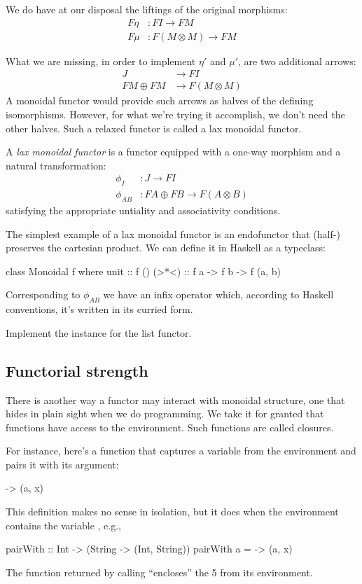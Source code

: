 \documentclass[DaoFP]{subfiles}
\begin{document}
We do have at our disposal the liftings of the original morphisms:
\begin{align*}
 F \eta &\colon F I \to F M \\
 F \mu &\colon F (M \otimes M) \to F M
\end{align*}

What we are missing, in order to implement $\eta'$ and $\mu'$, are two additional arrows:
\begin{align*}
J &\to F I\\
 F M \oplus F M &\to F (M \otimes M)
 \end{align*}
A monoidal functor would provide such arrows as halves of the defining isomorphisms. However, for what we're trying it accomplish, we don't need the other halves. Such a relaxed functor is called a lax monoidal functor. 

A \emph{lax monoidal functor} is a functor equipped with a one-way morphism and a natural transformation:
\begin{align*}
\phi_I &\colon J \to F I \\
\phi_{A B} &\colon F A \oplus F B \to F (A \otimes B)
\end{align*}
satisfying the appropriate untiality and associativity conditions.

The simplest example of a lax monoidal functor is an endofunctor that (half-) preserves the cartesian product. We can define it in Haskell as a typeclass:

\begin{haskell}
class Monoidal f where
  unit  :: f ()
  (>*<) :: f a -> f b -> f (a, b)
\end{haskell}
Corresponding to $\phi_{A B}$ we have an infix operator which, according to Haskell conventions, it's written in its curried form.

\begin{exercise}
Implement the  instance for the list functor.
\end{exercise}

\subsection{Functorial strength}

There is another way a functor may interact with monoidal structure, one that hides in plain sight when we do programming. We take it for granted that functions have access to the environment. Such functions are called closures. 

For instance, here's a function that captures a variable  from the environment and pairs it with its argument:
\begin{haskell}
\x -> (a, x)
\end{haskell}
This definition makes no sense in isolation, but it does when the environment contains the variable , e.g.,
\begin{haskell}
pairWith :: Int -> (String -> (Int, String))
pairWith a = \x -> (a, x)
\end{haskell}
The function returned by calling  ``encloses'' the 5 from its environment.
\end{document}
